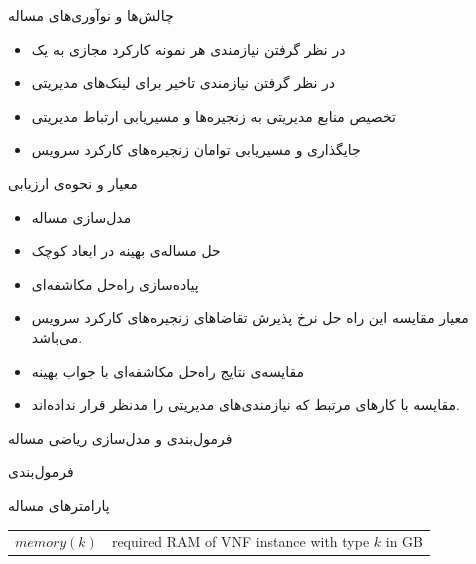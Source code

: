 \documentclass{beamer}
\makeatletter
\newcommand{\RTList}{\raggedleft\rightskip\@totalleftmargin}
\makeatother
\begin{document}
\begin{persian}
\begin{frame}{چالش‌ها و نوآوری‌های مساله} %
    \begin{itemize}\RTList{}
        \item در نظر گرفتن نیازمندی هر نمونه کارکرد مجازی به یک 
        \item در نظر گرفتن نیازمندی تاخیر برای لینک‌های مدیریتی
        \item تخصیص منابع مدیریتی به زنجیره‌ها و مسیریابی ارتباط مدیریتی
        \item جایگذاری و مسیریابی توامان زنجیره‌های کارکرد سرویس
    \end{itemize}
\end{frame}
\begin{frame}{معیار و نحوه‌ی ارزیابی} %
    \begin{itemize}\RTList{}
        \item مدل‌سازی مساله
        \item حل مساله‌ی بهینه در ابعاد کوچک
        \item پیاده‌سازی راه‌حل مکاشفه‌ای
        \item معیار مقایسه این راه حل نرخ پذیرش تقاضاهای زنجیره‌های کارکرد سرویس می‌باشد.
        \item مقایسه‌ی نتایج راه‌حل مکاشفه‌ای با جواب بهینه
        \item مقایسه با کارهای مرتبط که نیازمندی‌های مدیریتی را مدنظر قرار نداده‌اند.
    \end{itemize}
\end{frame}
\begin{frame}{} %
    \begin{center}
        فرمول‌بندی و مدل‌سازی ریاضی مساله
    \end{center}
\end{frame}
\begin{frame}{فرمول‌بندی} %
    \par پارامترهای مساله
    \begin{center}\begin{latin}\begin{tabular}{|c|p{5cm}|}
        \hline
        \(memory(k)\) & required RAM of VNF instance with type \(k\) in GB \\

\end{tabular}
\end{latin}
\end{center}
\end{frame}
\end{persian}
\end{document}
